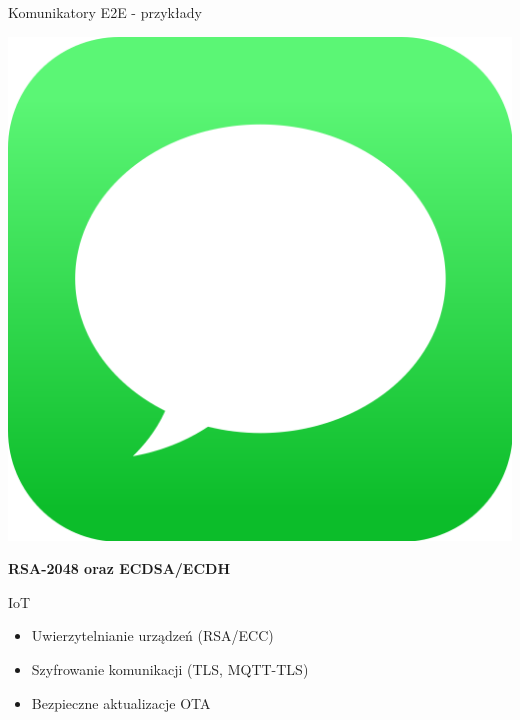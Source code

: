 \begin{frame}{Komunikatory E2E - przykłady}
\begin{center}
        \begin{minipage}{0.1\textwidth}
            \includegraphics[width=\textwidth]{applications/graphics/Imessage.png}
        \end{minipage}
        \begin{minipage}{0.6\textwidth}
            \textbf{RSA-2048 oraz ECDSA/ECDH}
        \end{minipage}
    \end{center}
\end{frame}

\begin{frame}{IoT}
    \begin{itemize}
        \item Uwierzytelnianie urządzeń (RSA/ECC)
        \item Szyfrowanie komunikacji (TLS, MQTT-TLS)
        \item Bezpieczne aktualizacje OTA
    \end{itemize}
\end{frame}
